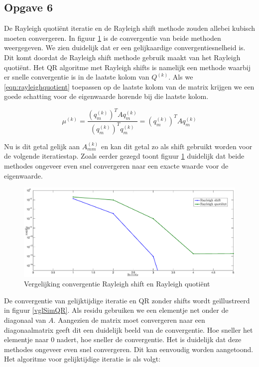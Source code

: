 \documentclass[a4paper, 12pt, titlepage]{report}
\begin{document}
\subsection{Opgave 6}
De Rayleigh quoti\"ent iteratie en de Rayleigh shift methode zouden allebei kubisch moeten convergeren. In figuur \ref{vglRayleigh} is de convergentie van beide methoden weergegeven. We zien duidelijk dat er een gelijkaardige convergentiesnelheid is. Dit komt doordat de Rayleigh shift methode gebruik maakt van het Rayleigh quoti\"ent. Het QR algoritme met Rayleigh shifts is namelijk een methode waarbij er snelle convergentie is in de laatste kolom van $Q^{(k)}$. Als we \eqref{eqn:rayleighquotient} toepassen op de laatste kolom van de matrix krijgen we een goede schatting voor de eigenwaarde horende bij die laatste kolom. 

\begin{equation}
	\mu^{(k)} = \frac{(q^{(k)}_m)^TAq^{(k)}_m}{(q^{(k)}_m)^Tq^{(k)}_m} = (q^{(k)}_m)^TAq^{(k)}_m
	\label{eqn:rayleighquotient}
\end{equation}

Nu is dit getal gelijk aan $A^{(k)}_{mm}$ en kan dit getal zo als shift gebruikt worden voor de volgende iteratiestap. Zoals eerder gezegd toont figuur \ref{vglRayleigh} duidelijk dat beide methodes ongeveer even snel convergeren naar een exacte waarde voor de eigenwaarde. \\

\begin{figure}[htb]
	\centering
	\includegraphics[width=\textwidth]{shiftvsquot.eps}
	\caption{Vergelijking convergentie Rayleigh shift en Rayleigh quoti\"ent}
	\label{vglRayleigh}
\end{figure}

De convergentie van gelijktijdige iteratie en QR zonder shifts wordt ge\"illustreerd in figuur \ref{vglSimQR}. Als residu gebruiken we een elementje net onder de diagonaal van $A$. Aangezien de matrix moet convergeren naar een diagonaalmatrix geeft dit een duidelijk beeld van de convergentie. Hoe sneller het elementje naar 0 nadert, hoe sneller de convergentie. Het is duidelijk dat deze methodes ongeveer even snel convergeren. Dit kan eenvoudig worden aangetoond. Het algoritme voor gelijktijdige iteratie is als volgt:
\end{document}
